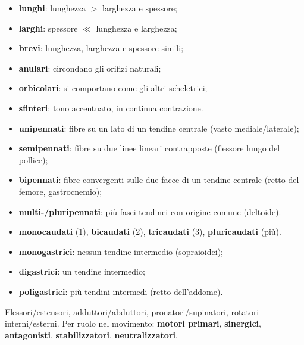 \begin{itemize}
  \item \textbf{lunghi}: lunghezza $>$ larghezza e spessore;
  \item \textbf{larghi}: spessore $\ll$ lunghezza e larghezza;
  \item \textbf{brevi}: lunghezza, larghezza e spessore simili;
  \item \textbf{anulari}: circondano gli orifizi naturali;
  \item \textbf{orbicolari}: si comportano come gli altri scheletrici;
  \item \textbf{sfinteri}: tono accentuato, in continua contrazione.
\end{itemize}

\begin{itemize}
  \item \textbf{unipennati}: fibre su un lato di un tendine centrale (vasto mediale/laterale);
  \item \textbf{semipennati}: fibre su due linee lineari contrapposte (flessore lungo del pollice);
  \item \textbf{bipennati}: fibre convergenti sulle due facce di un tendine centrale (retto del
    femore, gastrocnemio);
  \item \textbf{multi-/pluripennati}: più fasci tendinei con origine comune (deltoide).
\end{itemize}

\begin{itemize}
  \item \textbf{monocaudati} (1), \textbf{bicaudati} (2), \textbf{tricaudati} (3),
    \textbf{pluricaudati} (più).
\end{itemize}

\begin{itemize}
  \item \textbf{monogastrici}: nessun tendine intermedio (sopraioidei);
  \item \textbf{digastrici}: un tendine intermedio;
  \item \textbf{poligastrici}: più tendini intermedi (retto dell'addome).
\end{itemize}

Flessori/estensori, adduttori/abduttori, pronatori/supinatori, rotatori interni/esterni. Per ruolo
nel movimento: \textbf{motori primari}, \textbf{sinergici}, \textbf{antagonisti},
\textbf{stabilizzatori}, \textbf{neutralizzatori}.

